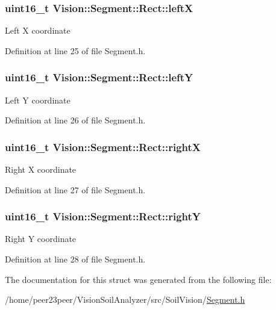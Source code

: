 \subsubsection[{left\+X}]{\setlength{\rightskip}{0pt plus 5cm}uint16\+\_\+t Vision\+::\+Segment\+::\+Rect\+::left\+X}\label{struct_vision_1_1_segment_1_1_rect_acf3a2a045d75348971e57df5eeb7808e}
Left X coordinate 

Definition at line 25 of file Segment.\+h.

\hypertarget{struct_vision_1_1_segment_1_1_rect_ac6d22f96862077f159abc7e1accc20ab}{}
\subsubsection[{left\+Y}]{\setlength{\rightskip}{0pt plus 5cm}uint16\+\_\+t Vision\+::\+Segment\+::\+Rect\+::left\+Y}\label{struct_vision_1_1_segment_1_1_rect_ac6d22f96862077f159abc7e1accc20ab}
Left Y coordinate 

Definition at line 26 of file Segment.\+h.

\hypertarget{struct_vision_1_1_segment_1_1_rect_a6de0dfefe6b8360ee4d57027d1fba928}{}
\subsubsection[{right\+X}]{\setlength{\rightskip}{0pt plus 5cm}uint16\+\_\+t Vision\+::\+Segment\+::\+Rect\+::right\+X}\label{struct_vision_1_1_segment_1_1_rect_a6de0dfefe6b8360ee4d57027d1fba928}
Right X coordinate 

Definition at line 27 of file Segment.\+h.

\hypertarget{struct_vision_1_1_segment_1_1_rect_ab1a913248c715c25362c478498246983}{}
\subsubsection[{right\+Y}]{\setlength{\rightskip}{0pt plus 5cm}uint16\+\_\+t Vision\+::\+Segment\+::\+Rect\+::right\+Y}\label{struct_vision_1_1_segment_1_1_rect_ab1a913248c715c25362c478498246983}
Right Y coordinate 

Definition at line 28 of file Segment.\+h.



The documentation for this struct was generated from the following file\+:\begin{DoxyCompactItemize}
\item 
/home/peer23peer/\+Vision\+Soil\+Analyzer/src/\+Soil\+Vision/\hyperlink{_segment_8h}{Segment.\+h}\end{DoxyCompactItemize}
